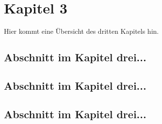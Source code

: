 \chapter{Kapitel 3}
\label{sec:Kapitel3}

Hier kommt eine Übersicht des dritten Kapitels hin.

\section{Abschnitt im Kapitel drei...}
\label{sec:abschnitt3.1}

\section{Abschnitt im Kapitel drei...}

\section{Abschnitt im Kapitel drei...}
